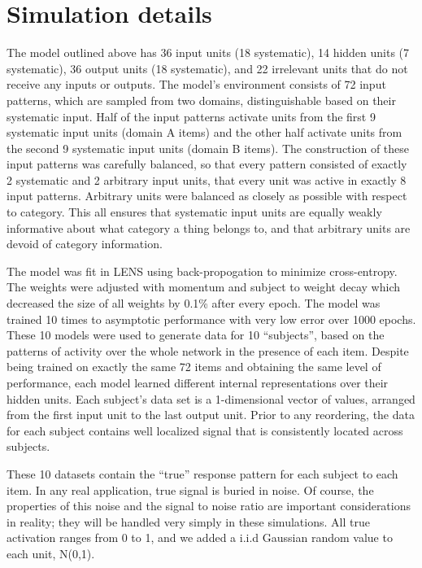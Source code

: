 \section{Simulation details}
The model outlined above has 36 input units (18 systematic), 14 hidden units (7 systematic), 36 output units (18 systematic), and 22 irrelevant units that do not receive any inputs or outputs. The model's environment consists of 72 input patterns, which are sampled from two domains, distinguishable based on their systematic input. Half of the input patterns activate units from the first 9 systematic input units (domain A items) and the other half activate units from the second 9 systematic input units (domain B items). The construction of these input patterns was carefully balanced, so that every pattern consisted of exactly 2 systematic and 2 arbitrary input units, that every unit was active in exactly 8 input patterns. Arbitrary units were balanced as closely as possible with respect to category. This all ensures that systematic input units are equally weakly informative about what category a thing belongs to, and that arbitrary units are devoid of category information.  

The model was fit in LENS \cite{rohde_lens:_1999} using back-propogation to minimize cross-entropy. The weights were adjusted with momentum and subject to weight decay which decreased the size of all weights by 0.1\% after every epoch. The model was trained 10 times to asymptotic performance with very low error over 1000 epochs. These 10 models were used to generate data for 10 ``subjects'', based on the patterns of activity over the whole network in the presence of each item. Despite being trained on exactly the same 72 items and obtaining the same level of performance, each model learned different internal representations over their hidden units. Each subject's data set is a 1-dimensional vector of values, arranged from the first input unit to the last output unit. Prior to any reordering, the data for each subject contains well localized signal that is consistently located across subjects.

These 10 datasets contain the ``true'' response pattern for each subject to each item. In any real application, true signal is buried in noise. Of course, the properties of this noise and the signal to noise ratio are important considerations in reality; they will be handled very simply in these simulations. All true activation ranges from 0 to 1, and we added a i.i.d Gaussian random value to each unit, N(0,1). 

